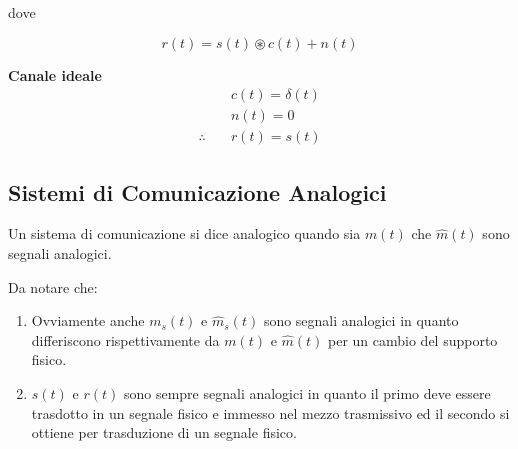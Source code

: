 dove

\[
    r(t) = s(t) \circledast c(t) + n(t)
\]

\textbf{Canale ideale}
\begin{align*}
                     & c(t) = \delta(t) \\
                     & n(t) = 0         \\
    \therefore \quad & r(t) = s(t)
\end{align*}


\subsection*{Sistemi di Comunicazione Analogici}
Un sistema di comunicazione si dice analogico quando sia \( m(t) \) che \( \hat{m}(t) \) sono segnali analogici.

Da notare che:
\begin{enumerate}
    \item Ovviamente anche \( m_s(t) \) e \( \hat{m}_s(t) \) sono segnali analogici in quanto differiscono rispettivamente da \( m(t) \) e \( \hat{m}(t) \) per un cambio del supporto fisico.
    \item \( s(t) \) e \( r(t) \) sono sempre segnali analogici in quanto il primo deve essere trasdotto in un segnale fisico e immesso nel mezzo trasmissivo ed il secondo si ottiene per trasduzione di un segnale fisico.
\end{enumerate}
